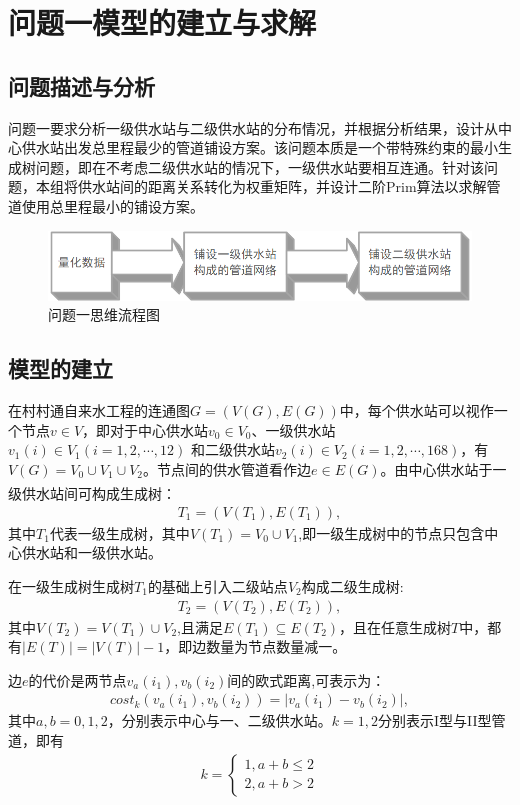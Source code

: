\documentclass{whutmod}
\newcommand{\upcite}[1]{\textsuperscript{\cite{#1}}}
\begin{document}
	\section{问题一模型的建立与求解}
		\subsection{问题描述与分析}
			问题一要求分析一级供水站与二级供水站的分布情况，并根据分析结果，设计从中心供水站出发总里程最少的管道铺设方案。该问题本质是一个带特殊约束的最小生成树问题，即在不考虑二级供水站的情况下，一级供水站要相互连通。针对该问题，本组将供水站间的距离关系转化为权重矩阵，并设计二阶Prim算法以求解管道使用总里程最小的铺设方案。
			
		
			\begin{figure}[H]
				\centering
				\includegraphics[width=\textwidth]{figures/chou.png}
				\caption{问题一思维流程图}\label{lct}
			\end{figure}
			
		\subsection{模型的建立}
		在村村通自来水工程的连通图$G=(V(G),E(G))$中，每个供水站可以视作一个节点$v \in V$，即对于中心供水站$v_0 \in V_0$、一级供水站$v_1(i) \in V_1 (i=1,2,\cdots,12)$ 和二级供水站$v_2(i) \in V_2 (i=1,2,\cdots,168)$，有$V(G)=V_0\cup  V_1\cup V_2$。节点间的供水管道看作边$e \in E(G)$。由中心供水站于一级供水站间可构成生成树\upcite{6}：
		\begin{gather*}
		T_{1}=(V(T_{1}),E(T_{1})),
		\end{gather*}
		其中$T_{1}$代表一级生成树，其中$V(T_{1})=V_0\cup V_1$,即一级生成树中的节点只包含中心供水站和一级供水站。
		
		在一级生成树生成树$T_1$的基础上引入二级站点$V_2$构成二级生成树:
		\begin{gather*}	
		T_{2}=(V(T_{2}),E(T_{2})),
		\end{gather*}
		其中$V(T_{2})=V(T_{1})\cup V_2$,且满足$E(T_{1})\subseteq  E(T_{2})$，且在任意生成树$T$中，都有$|E(T)|=|V(T)|-1$，即边数量为节点数量减一。
		
		边$e$的代价是两节点$v_a(i_1), v_b(i_2)$间的欧式距离,可表示为：
		\begin{gather}
		cost_{k}(v_a(i_1),v_b(i_2))=\left | v_a(i_1)-v_b(i_2) \right |,
		\end{gather}
		其中$a,b=0,1,2$，分别表示中心与一、二级供水站。$k=1,2$分别表示I型与II型管道，即有
			\begin{gather}
			k=\left\{\begin{matrix}1,a+b\leqslant 2
			\\ 2,a+b>2
			\end{matrix}\right .
			\end{gather}
		
\end{document}
